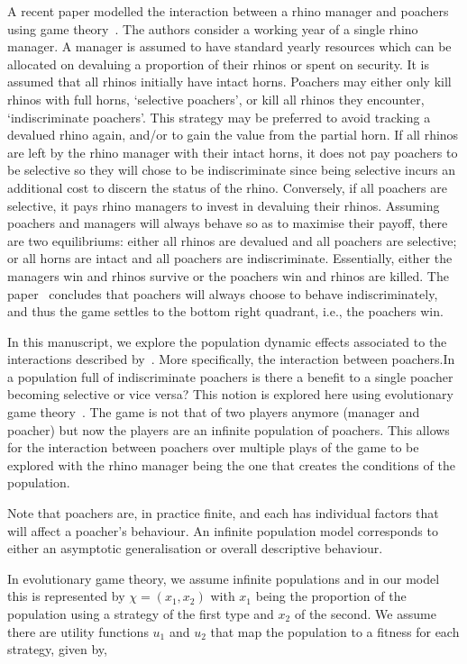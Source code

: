 \documentclass[10pt]{article}
\begin{document}
A recent paper modelled the interaction between a rhino manager and poachers
using game theory~\cite{Lee}. The authors consider a working year of a single
rhino manager. A manager is assumed to have standard yearly resources which
can be allocated on devaluing a proportion of their rhinos or spent on security.
It is assumed that all rhinos initially have intact horns. Poachers may either only
kill rhinos with full horns, `selective poachers', or kill all rhinos they encounter,
`indiscriminate poachers'. This strategy may be preferred to avoid tracking a
devalued rhino again, and/or to gain the value from the partial horn. If all rhinos
are left by the rhino manager with their intact horns, it does not pay poachers to
be selective so they will chose to be indiscriminate since being selective incurs
an additional cost to discern the status of the rhino. Conversely, if all poachers are
selective, it pays rhino managers to invest in devaluing their rhinos.
Assuming poachers and managers will always behave so as to maximise their payoff,
there are two equilibriums: either all rhinos are devalued and all poachers are selective;
or all horns are intact and all poachers are indiscriminate. Essentially, either
the managers win and rhinos survive or the poachers win and rhinos are killed. The
paper~\cite{Lee} concludes that poachers will always choose to behave indiscriminately,
and thus the game settles to the bottom right quadrant, i.e., the poachers win.


In this manuscript, we explore the population dynamic effects associated to
the interactions described by~\cite{Lee}. More specifically, the interaction between
poachers.In a population full of indiscriminate poachers is there
a benefit to a single poacher becoming selective or vice versa? This notion
is explored here using evolutionary game theory~\cite{Smith}. The
game is not that of two players anymore (manager and poacher) but now the players
are an infinite population of poachers. This allows for the interaction between
poachers over multiple plays of the game to be explored with the rhino manager
being the one that creates the conditions of the population.

Note that poachers are, in practice finite, and each has individual factors that will
affect a poacher's behaviour. An infinite population model corresponds to either
an asymptotic generalisation or overall descriptive behaviour.

In evolutionary game theory, we assume infinite populations and in our
model this is represented by \(\chi=(x_1, x_2)\) with \(x_1\) being the proportion
of the population using a strategy of the first type and \(x_2\) of the second. We
assume there are utility functions \(u_1\) and \(u_2\) that map the population
to a fitness for each strategy, given by,
\end{document}
